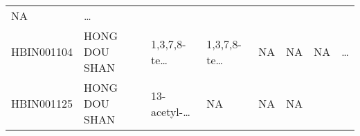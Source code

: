 \documentclass[
]{article}
\begin{document}
\begin{longtable}[]{@{}llllllll@{}}
\begin{minipage}[t]{0.11\columnwidth}
NA\strut
\end{minipage} & \begin{minipage}[t]{0.03\columnwidth}\raggedright
\ldots{}\strut
\end{minipage}\tabularnewline
\begin{minipage}[t]{0.11\columnwidth}\raggedright
HBIN001104\strut
\end{minipage} & \begin{minipage}[t]{0.11\columnwidth}\raggedright
HONG DOU SHAN\strut
\end{minipage} & \begin{minipage}[t]{0.14\columnwidth}\raggedright
1,3,7,8-te\ldots{}\strut
\end{minipage} & \begin{minipage}[t]{0.14\columnwidth}\raggedright
1,3,7,8-te\ldots{}\strut
\end{minipage} & \begin{minipage}[t]{0.08\columnwidth}\raggedright
NA\strut
\end{minipage} & \begin{minipage}[t]{0.09\columnwidth}\raggedright
NA\strut
\end{minipage} & \begin{minipage}[t]{0.11\columnwidth}\raggedright
NA\strut
\end{minipage} & \begin{minipage}[t]{0.03\columnwidth}\raggedright
\ldots{}\strut
\end{minipage}\tabularnewline
\begin{minipage}[t]{0.11\columnwidth}\raggedright
HBIN001125\strut
\end{minipage} & \begin{minipage}[t]{0.11\columnwidth}\raggedright
HONG DOU SHAN\strut
\end{minipage} & \begin{minipage}[t]{0.14\columnwidth}\raggedright
13-acetyl-\ldots{}\strut
\end{minipage} & \begin{minipage}[t]{0.14\columnwidth}\raggedright
NA\strut
\end{minipage} & \begin{minipage}[t]{0.08\columnwidth}\raggedright
NA\strut
\end{minipage} & \begin{minipage}[t]{0.09\columnwidth}\raggedright
NA\strut
\end{minipage} & \begin{minipage}[t]{0.11\columnwidth}\raggedright

\end{minipage}
\end{longtable}
\end{document}
